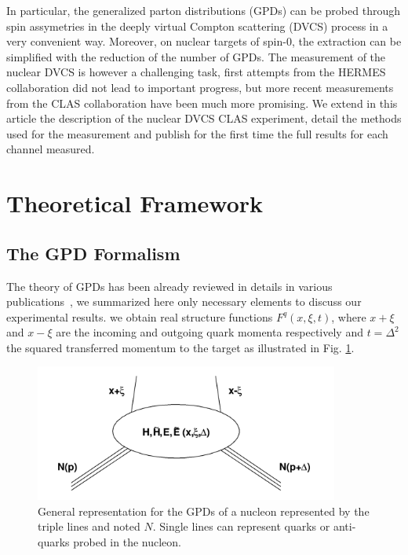 \documentclass[aps,prc,preprint,superscriptaddress]{revtex4}
\begin{document}
In particular, the generalized parton distributions (GPDs) can be probed through
spin assymetries in the deeply virtual Compton scattering (DVCS) process in a very 
convenient way. Moreover, on nuclear targets of spin-0, the extraction can be 
simplified with the reduction of the number of GPDs. The measurement of the nuclear
DVCS is however a challenging task, first attempts from the HERMES collaboration 
\cite{} did not lead to important progress, but more recent measurements from the
CLAS collaboration \cite{} have been much more promising. We extend in this article 
the description of the nuclear DVCS CLAS experiment, detail the methods used for the
measurement and publish for the first time the full results for each channel measured.


\section{Theoretical Framework}

\subsection{The GPD Formalism}

The theory of GPDs has been already reviewed in details in various 
publications~\cite{Diehl:2003ny,Belitsky:2005qn,Boffi:2007yc,Guidal:2013rya},
we summarized here only necessary elements to discuss our experimental results.
we obtain real structure functions 
$F^{q}(x,\xi,t)$, where $x+\xi$ and $x-\xi$ are the incoming and outgoing quark momenta 
respectively and $t=\Delta^2$ the squared transferred momentum to the target as illustrated in 
Fig. \ref{fig:GPD}. 

\begin{figure}[tbp!]
\center
\includegraphics[width=10.0cm]{fig1/GPD.png}
\caption{General representation for the GPDs of a nucleon represented by the triple lines and noted $N$.
	Single lines can represent quarks or anti-quarks probed in the nucleon.}
\label{fig:GPD}
\end{figure}
\end{document}
